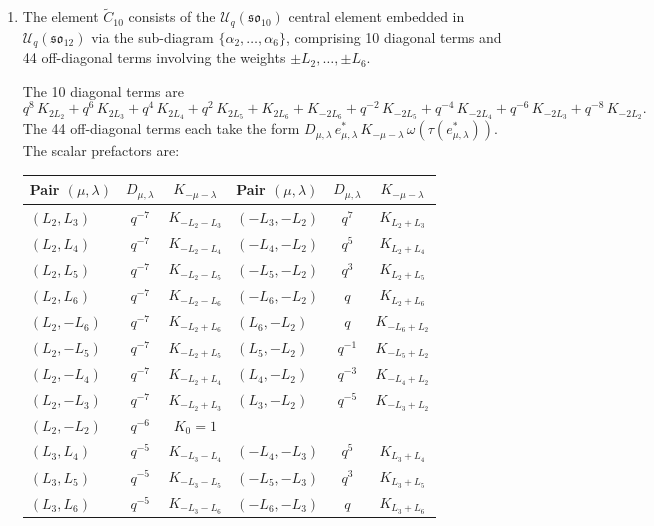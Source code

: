 \documentclass{ximera}
\newcommand{\so}{\mathfrak{so}}
\newcommand{\Uq}{\mathcal{U}_q}
\begin{document}
\begin{theorem}
\begin{enumerate}

\normalsize

\item The element $\widetilde{C}_{10}$ consists of the $\Uq(\so_{10})$ central element embedded in $\Uq(\so_{12})$ via the sub-diagram $\{\alpha_2, \ldots, \alpha_6\}$, comprising 10 diagonal terms and 44 off-diagonal terms involving the weights $\pm L_2, \ldots, \pm L_6$.

The 10 diagonal terms are
\[
    q^{8}\, K_{2L_2} + q^{6}\, K_{2L_3} + q^{4}\, K_{2L_4} + q^{2}\, K_{2L_5} + K_{2L_6} + K_{-2L_6} + q^{-2}\, K_{-2L_5} + q^{-4}\, K_{-2L_4} + q^{-6}\, K_{-2L_3} + q^{-8}\, K_{-2L_2}.
\]
The 44 off-diagonal terms each take the form $D_{\mu,\lambda}\, e^*_{\mu,\lambda}\, K_{-\mu-\lambda}\, \omega(\tau(e^*_{\mu,\lambda}))$. The scalar prefactors are:
\begin{center}
\begin{tabular}{lcc|lcc}
\hline
Pair $(\mu,\lambda)$ & $D_{\mu,\lambda}$ & $K_{-\mu-\lambda}$ & Pair $(\mu,\lambda)$ & $D_{\mu,\lambda}$ & $K_{-\mu-\lambda}$ \\
\hline
$(L_2, L_3)$ & $q^{-7}$ & $K_{-L_2-L_3}$ & $(-L_3, -L_2)$ & $q^{7}$ & $K_{L_2+L_3}$ \\
$(L_2, L_4)$ & $q^{-7}$ & $K_{-L_2-L_4}$ & $(-L_4, -L_2)$ & $q^{5}$ & $K_{L_2+L_4}$ \\
$(L_2, L_5)$ & $q^{-7}$ & $K_{-L_2-L_5}$ & $(-L_5, -L_2)$ & $q^{3}$ & $K_{L_2+L_5}$ \\
$(L_2, L_6)$ & $q^{-7}$ & $K_{-L_2-L_6}$ & $(-L_6, -L_2)$ & $q$ & $K_{L_2+L_6}$ \\
$(L_2, -L_6)$ & $q^{-7}$ & $K_{-L_2+L_6}$ & $(L_6, -L_2)$ & $q$ & $K_{-L_6+L_2}$ \\
$(L_2, -L_5)$ & $q^{-7}$ & $K_{-L_2+L_5}$ & $(L_5, -L_2)$ & $q^{-1}$ & $K_{-L_5+L_2}$ \\
$(L_2, -L_4)$ & $q^{-7}$ & $K_{-L_2+L_4}$ & $(L_4, -L_2)$ & $q^{-3}$ & $K_{-L_4+L_2}$ \\
$(L_2, -L_3)$ & $q^{-7}$ & $K_{-L_2+L_3}$ & $(L_3, -L_2)$ & $q^{-5}$ & $K_{-L_3+L_2}$ \\
$(L_2, -L_2)$ & $q^{-6}$ & $K_0 = 1$ & & & \\
\hline
$(L_3, L_4)$ & $q^{-5}$ & $K_{-L_3-L_4}$ & $(-L_4, -L_3)$ & $q^{5}$ & $K_{L_3+L_4}$ \\
$(L_3, L_5)$ & $q^{-5}$ & $K_{-L_3-L_5}$ & $(-L_5, -L_3)$ & $q^{3}$ & $K_{L_3+L_5}$ \\
$(L_3, L_6)$ & $q^{-5}$ & $K_{-L_3-L_6}$ & $(-L_6, -L_3)$ & $q$ & $K_{L_3+L_6}$ \\

\end{tabular}
\end{center}
\end{enumerate}
\end{theorem}
\end{document}
